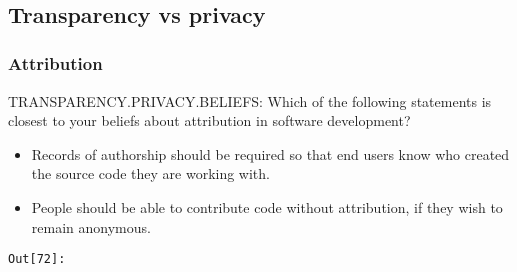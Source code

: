 \documentclass[11pt]{article}
\providecommand{\tightlist}{%
      \setlength{\itemsep}{0pt}\setlength{\parskip}{0pt}}
\begin{document}

    


    \begin{center}
    \end{center}
    { \hspace*{\fill} \\}
    
    \subsection{Transparency vs privacy}\label{transparency-vs-privacy}

    \subsubsection{Attribution}\label{attribution}

TRANSPARENCY.PRIVACY.BELIEFS: Which of the following statements is
closest to your beliefs about attribution in software development?

\begin{itemize}
\tightlist
\item
  Records of authorship should be required so that end users know who
  created the source code they are working with.
\item
  People should be able to contribute code without attribution, if they
  wish to remain anonymous.
\end{itemize}

\texttt{\color{outcolor}Out[{\color{outcolor}72}]:}
    
\end{document}
